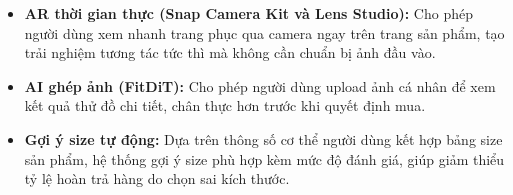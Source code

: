 \begin{itemize}
    \item \textbf{AR thời gian thực (Snap Camera Kit và Lens Studio):} Cho phép người dùng xem nhanh trang phục qua camera ngay trên trang sản phẩm, tạo trải nghiệm tương tác tức thì mà không cần chuẩn bị ảnh đầu vào.
    \item \textbf{AI ghép ảnh (FitDiT):} Cho phép người dùng upload ảnh cá nhân để xem kết quả thử đồ chi tiết, chân thực hơn trước khi quyết định mua.
    \item \textbf{Gợi ý size tự động:} Dựa trên thông số cơ thể người dùng kết hợp bảng size sản phẩm, hệ thống gợi ý size phù hợp kèm mức độ đánh giá, giúp giảm thiểu tỷ lệ hoàn trả hàng do chọn sai kích thước.
\end{itemize}